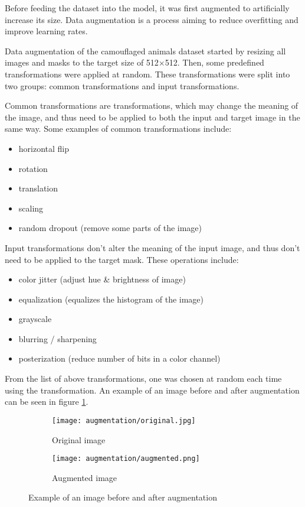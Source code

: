 \documentclass[../main.tex]{subfiles}
\begin{document}
Before feeding the dataset into the model, it was first augmented to artificially increase its size. Data augmentation is a process aiming to reduce overfitting and improve learning rates.

Data augmentation of the camouflaged animals dataset started by resizing all images and masks to the target size of 512$\times$512. Then, some predefined transformations were applied at random. These transformations were split into two groups: common transformations and input transformations.

Common transformations are transformations, which may change the meaning of the image, and thus need to be applied to both the input and target image in the same way. Some examples of common transformations include:
\begin{itemize}
	\item horizontal flip
	\item rotation
	\item translation
	\item scaling
	\item random dropout (remove some parts of the image)
\end{itemize}

Input transformations don't alter the meaning of the input image, and thus don't need to be applied to the target mask. These operations include:
\begin{itemize}
	\item color jitter (adjust hue \& brightness of image)
	\item equalization (equalizes the histogram of the image)
	\item grayscale
	\item blurring / sharpening
	\item posterization (reduce number of bits in a color channel)
\end{itemize}

From the list of above transformations, one was chosen at random each time using the  transformation. An example of an image before and after augmentation can be seen in figure \ref{fig:augmentation_example}.

\begin{figure}[htb]
\centering

\begin{subfigure}{0.537\textwidth}
\centering
\texttt{[image: augmentation/original.jpg]}
\caption{Original image}
\end{subfigure}
\begin{subfigure}{0.363\textwidth}
\centering
\texttt{[image: augmentation/augmented.png]}
\caption{Augmented image}
\end{subfigure}

\caption{Example of an image before and after augmentation}
\label{fig:augmentation_example}

\end{figure}
\end{document}
